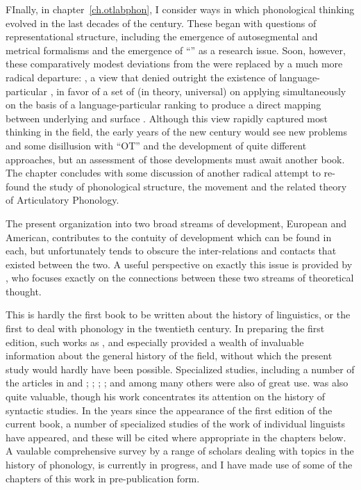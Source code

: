 FInally, in chapter~\ref{ch.otlabphon}, I consider ways in which
phonological thinking evolved in the last decades of the
century. These began with questions of representational structure,
including the emergence of autosegmental and metrical formalisms and
the emergence of ``'' as a research issue. Soon,
however, these comparatively modest deviations from the \textsl{}
were replaced by a much more radical departure: , a
view that denied outright the existence of language-particular
, in favor of a set of (in theory, universal)
 on  applying simultaneously on the basis of
a language-particular ranking to produce a direct mapping between
underlying and surface . Although this view rapidly
captured most thinking in the field, the early years of the new
century would see new problems and some disillusion with ``OT'' and
the development of quite different approaches, but an assessment of
those developments must await another book. The chapter concludes with
some discussion of another radical attempt to re-found the study of
phonological structure, the  movement and the
related theory of Articulatory Phonology.

The present organization into two broad streams of development,
European and American, contributes to the contuity of development
which can be found in each, but unfortunately tends to obscure the
inter-relations and contacts that existed between the two. A useful
perspective on exactly this issue is provided by
\citet{newmeyer21:structuralism}, who focuses exactly on the
connections between these two streams of theoretical thought.

This is hardly the first book to be written about the history of
linguistics, or the first to deal with phonology in the twentieth
century.  In preparing the first edition, such works as
\citet{robins67:history}, and especially
\citet{fischer-jorgensen75:trends} provided a wealth of invaluable
information about the general history of the field, without which the
present study would hardly have been possible.  Specialized studies,
including a number of the articles in \citet{jakobson71:sel.wr.2} and
\citet{hymes74:traditions}; \citet{kilbury76:morphophonemics};
\citet{stankiewicz72:baudouin.anthology};
\citet{langendoen68:london.school}; and
\citet{hymes.fought81:structuralism} among many others were also of
great use.  \citet{newmeyer:ltia2} was also quite valuable, though his
work concentrates its attention on the history of syntactic
studies. In the years since the appearance of the first edition of the
current book, a number of specialized studies of the work of
individual linguists have appeared, and these will be cited where
appropriate in the chapters below. A vaulable comprehensive survey by
a range of scholars dealing with topics in the history of phonology,
\citet{dresher.vanderhulst21:oxford.handbook} is currently in
progress, and I have made use of some of the chapters of this work in
pre-publication form.

